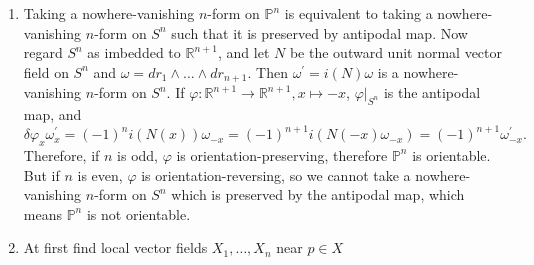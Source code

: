 \begin{enumerate}
$(\Rightarrow)$ Let $\omega^{\prime}$ be a nowhere-vanishing $d$-form on $X$. 
For $x \in X$ choose $X_{1}, \ldots, X_{d} \in X_{x}$ which satisfies $\widetilde{X_{1}} \wedge \ldots \wedge \widetilde{X_{d}}=\omega_{x}$. 
Then we can pick $N(x) \in\big(\mathbb{R}^{d+1}\big)_{f(x)}$ s.t. $N(x)$ is orthogonal to $d f(X_{x})$ and $\omega(d f(X_{1}), \ldots, d f(X_{d}), N(x))=1$ where $\omega=d r_{1} \wedge \ldots \wedge d r_{d+1}$. 
$N(x)$ is independent of the choice of $X_{1}, \ldots, X_{d} \in X_{x}$, 
since for $Y_{1}, \ldots, Y_{d}$ which also satisfies $\widetilde{Y}_{1} \wedge \ldots \wedge \widetilde{Y_{d}}=\omega_{x}$, 
one can express $Y_{i}=\sum_{j} a_{ij} X_{j}$, 
then using Exercise 2.10, we see that $\det a_{ij}=1$. 
Thus $\omega(d f(Y_{1}), \ldots, d f(Y_{d}), N(x))=1$ also. 
Then since $d f(X_{x})^{\perp}$ is $1$-dimensional, 
$N(x)$ which satisfies the condition above is uniquely determined. 
Also, it is by definition nowhere-vanishing. 
It remains to show that $N$ is smooth, but locally on the neighborhood of $x \in X$ 
we can choose smooth vector field $X_{1}, \ldots, X_{d}$ 
which satisfies $\widetilde{X_{1}} \wedge \ldots \wedge \widetilde{X_{d}}=\omega^{\prime}$ on the neighborhood, 
and $d f(X_{1}), \ldots, d f(X_{d})$ is also smooth on the neighborhood of $f(x)$ over $f(X)$. 
Therefore locally $N$ is also smooth (locally you can use the Gram--Schmidt process, and scaling if necessary, 
then the result $N(x)$ would be a smooth function of the local coordinates of $x$).
\item Taking a nowhere-vanishing $n$-form on $\mathbb{P}^{n}$ is equivalent to 
taking a nowhere-vanishing $n$-form on $S^{n}$ such that it is preserved by antipodal map. 
Now regard $S^{n}$ as imbedded to $\mathbb{R}^{n+1}$, and let $N$ be the outward unit normal vector field on $S^{n}$ and $\omega=d r_{1} \wedge \ldots \wedge d r_{n+1}$. 
Then $\omega^{\prime}=i(N) \omega$ is a nowhere-vanishing $n$-form on $S^{n}$. 
If $\varphi\colon \mathbb{R}^{n+1} \rightarrow \mathbb{R}^{n+1}, x \mapsto-x$, 
$\varphi|_{S^{n}}$ is the antipodal map, and
\[\delta \varphi_{x} \omega_{x}^{\prime}=(-1)^{n} i(N(x)) \omega_{-x}
=(-1)^{n+1} i(N(-x) \omega_{-x})=(-1)^{n+1} \omega_{-x}^{\prime}.\]
Therefore, if $n$ is odd, $\varphi$ is orientation-preserving, therefore $\mathbb{P}^{n}$ is orientable. 
But if $n$ is even, $\varphi$ is orientation-reversing, 
so we cannot take a nowhere-vanishing $n$-form on $S^{n}$ which is preserved by the antipodal map, 
which means $\mathbb{P}^{n}$ is not orientable.
\item At first find local vector fields $X_{1}, \ldots, X_{n}$ near $p \in X$ 

\end{enumerate}
